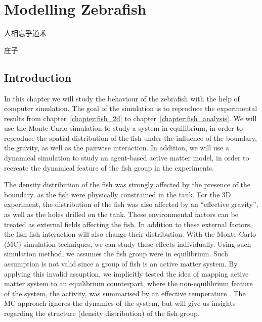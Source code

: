 \documentclass[11pt,twoside]{report}
\begin{document}
\chapter{Modelling Zebrafish}
\label{chapter:fish_model}


\epigraph{人相忘乎道术}{庄子}


\section{Introduction}

In this chapter we will study the behaviour of the zebrafish with the help of computer simulation. The goal of the simulation is to reproduce the experimental results from chapter~\ref{chapter:fish_2d} to chapter~\ref{chapter:fish_analysis}.
We will use the Monte-Carlo simulation to study a system in equilibrium, in order to reproduce the spatial distribution of the fish under the influence of the boundary, the gravity, as well as the pairwise interaction.
In addition, we will use a dynamical simulation to study an agent-based active matter model, in order to recreate the dynamical feature of the fish group in the experiments.

The density distribution of the fish was strongly affected by the presence of the boundary, as the fish were physically constrained in the tank.
For the 3D experiment, the distribution of the fish was also affected by an ``effective gravity'', as well as the holes drilled on the tank. These environmental factors can be treated as external fields affecting the fish. In addition to these external factors, the fish-fish interaction will also change their distribution.
With the Monte-Carlo (\gls{MC}) simulation techniques, we can study these effects individually. Using such simulation method, we assumes the fish group were in equilibrium. Such assumption is not valid since a group of fish is an active matter system. By applying this invalid assuption, we implicitly tested the idea of mapping active matter system to an equilibrium counterpart, where the non-equilibrium feature of the system, the activity, was summarised by an effective temperature \cite{palacci2010, klongvessa2019}. The MC approach ignores the dynamics of the system, but will give us insights regarding the structure (density distribution) of the fish group.
\end{document}
